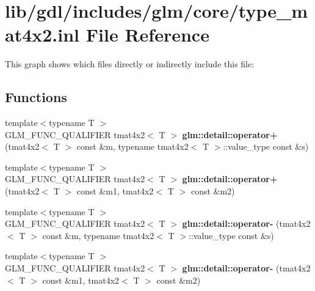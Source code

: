 \hypertarget{type__mat4x2_8inl}{}\section{lib/gdl/includes/glm/core/type\+\_\+mat4x2.inl File Reference}
\label{type__mat4x2_8inl}
This graph shows which files directly or indirectly include this file\+:
\subsection*{Functions}
\begin{DoxyCompactItemize}
\item 
\hypertarget{namespaceglm_1_1detail_ae54e3cfbc64edbac080b6f07b2c3d0a9}{}{\footnotesize template$<$typename T $>$ }\\G\+L\+M\+\_\+\+F\+U\+N\+C\+\_\+\+Q\+U\+A\+L\+I\+F\+I\+E\+R tmat4x2$<$ T $>$ {\bfseries glm\+::detail\+::operator+} (tmat4x2$<$ T $>$ const \&m, typename tmat4x2$<$ T $>$\+::value\+\_\+type const \&s)\label{namespaceglm_1_1detail_ae54e3cfbc64edbac080b6f07b2c3d0a9}

\item 
\hypertarget{namespaceglm_1_1detail_a4e7eaef749bb4c383065c7738772a6d7}{}{\footnotesize template$<$typename T $>$ }\\G\+L\+M\+\_\+\+F\+U\+N\+C\+\_\+\+Q\+U\+A\+L\+I\+F\+I\+E\+R tmat4x2$<$ T $>$ {\bfseries glm\+::detail\+::operator+} (tmat4x2$<$ T $>$ const \&m1, tmat4x2$<$ T $>$ const \&m2)\label{namespaceglm_1_1detail_a4e7eaef749bb4c383065c7738772a6d7}

\item 
\hypertarget{namespaceglm_1_1detail_a49239cfb38e43d7728c0fb79f51bf57e}{}{\footnotesize template$<$typename T $>$ }\\G\+L\+M\+\_\+\+F\+U\+N\+C\+\_\+\+Q\+U\+A\+L\+I\+F\+I\+E\+R tmat4x2$<$ T $>$ {\bfseries glm\+::detail\+::operator-\/} (tmat4x2$<$ T $>$ const \&m, typename tmat4x2$<$ T $>$\+::value\+\_\+type const \&s)\label{namespaceglm_1_1detail_a49239cfb38e43d7728c0fb79f51bf57e}

\item 
\hypertarget{namespaceglm_1_1detail_aa1924521c994e049c51e66d103fbd649}{}{\footnotesize template$<$typename T $>$ }\\G\+L\+M\+\_\+\+F\+U\+N\+C\+\_\+\+Q\+U\+A\+L\+I\+F\+I\+E\+R tmat4x2$<$ T $>$ {\bfseries glm\+::detail\+::operator-\/} (tmat4x2$<$ T $>$ const \&m1, tmat4x2$<$ T $>$ const \&m2)\label{namespaceglm_1_1detail_aa1924521c994e049c51e66d103fbd649}


\end{DoxyCompactItemize}
